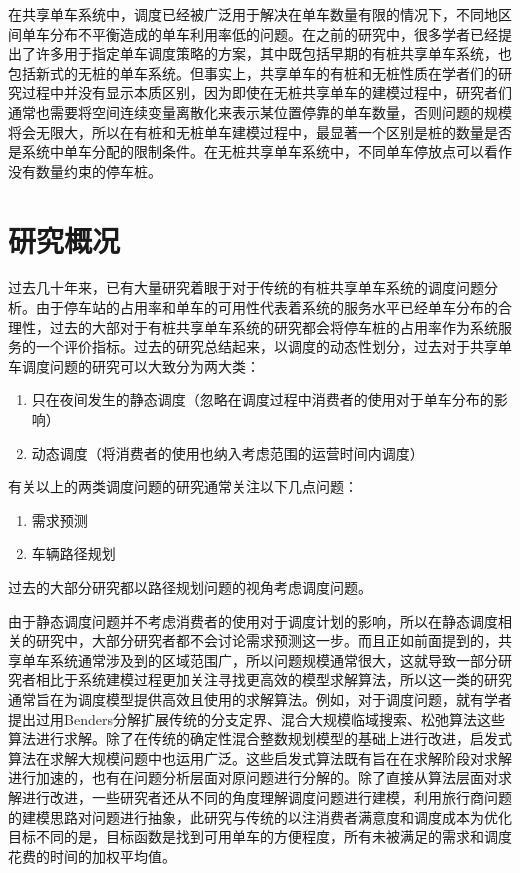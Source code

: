 \documentclass[]{tongjithesis}
\numberwithin{equation}{chapter}
\begin{document}
在共享单车系统中，调度已经被广泛用于解决在单车数量有限的情况下，不同地区间单车分布不平衡造成的单车利用率低的问题。在之前的研究中，很多学者已经提出了许多用于指定单车调度策略的方案，其中既包括早期的有桩共享单车系统，也包括新式的无桩的单车系统。但事实上，共享单车的有桩和无桩性质在学者们的研究过程中并没有显示本质区别，因为即使在无桩共享单车的建模过程中，研究者们通常也需要将空间连续变量离散化来表示某位置停靠的单车数量，否则问题的规模将会无限大，所以在有桩和无桩单车建模过程中，最显著一个区别是桩的数量是否是系统中单车分配的限制条件。在无桩共享单车系统中，不同单车停放点可以看作没有数量约束的停车桩。

\section{研究概况}
过去几十年来，已有大量研究着眼于对于传统的有桩共享单车系统的调度问题分析。由于停车站的占用率和单车的可用性代表着系统的服务水平已经单车分布的合理性，过去的大部对于有桩共享单车系统的研究都会将停车桩的占用率作为系统服务的一个评价指标。过去的研究总结起来，以调度的动态性划分，过去对于共享单车调度问题的研究可以大致分为两大类：\par
\begin{enumerate}
	\item 只在夜间发生的静态调度（忽略在调度过程中消费者的使用对于单车分布的影响）
	\item 动态调度（将消费者的使用也纳入考虑范围的运营时间内调度）
\end{enumerate}

有关以上的两类调度问题的研究通常关注以下几点问题：
\begin{enumerate}
	\item 需求预测
	\item 车辆路径规划
\end{enumerate}

过去的大部分研究都以路径规划问题的视角考虑调度问题。

由于静态调度问题并不考虑消费者的使用对于调度计划的影响，所以在静态调度相关的研究中，大部分研究者都不会讨论需求预测这一步。而且正如前面提到的，共享单车系统通常涉及到的区域范围广，所以问题规模通常很大，这就导致一部分研究者相比于系统建模过程更加关注寻找更高效的模型求解算法，所以这一类的研究通常旨在为调度模型提供高效且使用的求解算法。例如，对于调度问题，就有学者提出过用Benders分解扩展传统的分支定界\cite{erdougan2015exact}、混合大规模临域搜索\cite{pal2017free}、松弛算法\cite{chemla2013bike}这些算法进行求解。除了在传统的确定性混合整数规划模型的基础上进行改进，启发式算法在求解大规模问题中也运用广泛\cite{ho2014solving,forma20153}。这些启发式算法既有旨在在求解阶段对求解进行加速的，也有在问题分析层面对原问题进行分解的。除了直接从算法层面对求解进行改进，一些研究者还从不同的角度理解调度问题进行建模，利用旅行商问题的建模思路对问题进行抽象\cite{chemla2013bike}，此研究与传统的以注消费者满意度和调度成本为优化目标不同的是，目标函数是找到可用单车的方便程度，所有未被满足的需求和调度花费的时间的加权平均值。
\end{document}

